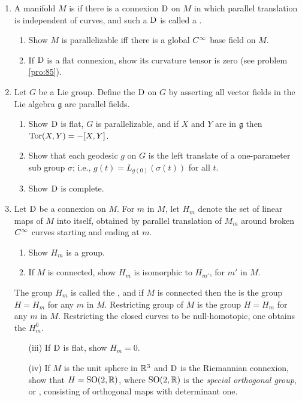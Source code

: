 \documentclass[../main]{subfiles}
\begin{document}
\begin{enumerate}
    \item\label{pro:45} A manifold $M$ is  if there is a connexion $\mathrm{D}$ on $M$ in which parallel translation is independent of curves, and such a $\mathrm{D}$ is called a . 
    \begin{enumerate}[label = (\roman*)]
        \item Show $M$ is parallelizable iff there is a global $C^\infty$ base field on $M$.
        \item If $\mathrm{D}$ is a flat connexion, show its curvature tensor is zero (see problem \ref{pro:85}).
    \end{enumerate}

    \item\label{pro:46} Let $G$ be a Lie group. Define the  $\mathrm{D}$ on $G$ by asserting all vector fields in the Lie algebra ${\mathfrak{g}}$ are parallel fields.
    \begin{enumerate}[label=(\roman*)]
        \item Show $\mathrm{D}$ is flat, $G$ is parallelizable, and if $X$ and $Y$ are in ${\mathfrak{g}}$ then $\mathrm{Tor}(X, Y)=-[X, Y]$.
        \item Show that each geodesic $g$ on $G$ is the left translate of a one-parameter sub group $\sigma$; i.e., $g(t)=L_{g(0)}(\sigma(t))$ for all $t$.
        \item Show $\mathrm{D}$ is complete.
     \end{enumerate}

    \item\label{pro:47} Let $\mathrm{D}$ be a connexion on $M$. For $m$ in $M$, let $H_m$ denote the set of linear maps of $M$ into itself, obtained by parallel translation of $M_m$ around broken $C^\infty$ curves starting and ending at $m$. 
    \begin{enumerate}[label = (\roman*)]
        \item Show $H_m$ is a group.
        \item If $M$ is connected, show $H_m$ is isomorphic to $H_{m'}$, for $m'$ in $M$.
    \end{enumerate}
    The group $H_m$ is called the , and if $M$ is connected then the  is the group $H=H_m$ for any $m$ in $M$. Restricting group of $M$ is the group $H=H_m$ for any $m$ in $M$. Restricting the closed curves to be null-homotopic, one obtains the  $H^0_m$.
    \begin{enumerate}
        \item[(iii)]  If $\mathrm{D}$  is flat, show $H_m=0$.
        \item[(iv)] If $M$ is the unit sphere in $\mathbb{R}^{3}$ and $\mathrm{D}$ is the Riemannian connexion, show that $H=\mathrm{SO}(2, \mathbb{R})$, where $\mathrm{SO}(2, \mathbb{R})$ is the \emph{special orthogonal group}, or , consisting of orthogonal maps with determinant one.
    \end{enumerate}
    


\end{enumerate}
\end{document}
